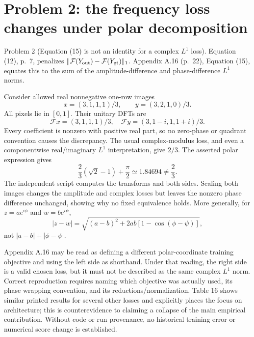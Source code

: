 \documentclass[10pt]{article}
\begin{document}
\section*{Problem 2: the frequency loss changes under polar decomposition}
Problem 2 (Equation (15) is not an identity for a complex \(L^1\) loss).  Equation (12), p. 7, penalizes \(\|\mathcal F(Y_{\rm out})-\mathcal F(Y_{\rm gt})\|_1\). Appendix A.16 (p. 22), Equation (15), equates this to the sum of the amplitude-difference and phase-difference \(L^1\) norms.\par
Consider allowed real nonnegative one-row images \[x=(3,1,1,1)/3,\qquad y=(3,2,1,0)/3.\] All pixels lie in \([0,1]\). Their unitary DFTs are \[\mathcal F x=(3,1,1,1)/3,\quad
 \mathcal F y=(3,1-i,1,1+i)/3.\] Every coefficient is nonzero with positive real part, so no zero-phase or quadrant convention causes the discrepancy. The usual complex-modulus loss, and even a componentwise real/imaginary \(L^1\) interpretation, give \(2/3\). The asserted polar expression gives \[\frac{2}{3}(\sqrt2-1)+\frac{\pi}{2}
 \simeq 1.84694\ne\frac23.\] The independent script computes the transforms and both sides. Scaling both images changes the amplitude and complex losses but leaves the nonzero phase difference unchanged, showing why no fixed equivalence holds. More generally, for \(z=a e^{i\phi}\) and \(w=b e^{i\psi}\), \[|z-w|=\sqrt{(a-b)^2+2ab[1-\cos(\phi-\psi)]},\] not \(|a-b|+|\phi-\psi|\).\par
Appendix A.16 may be read as defining a different polar-coordinate training objective and using the left side as shorthand. Under that reading, the right side is a valid chosen loss, but it must not be described as the same complex \(L^1\) norm. Correct reproduction requires naming which objective was actually used, its phase wrapping convention, and its reductions/normalization. Table 16 shows similar printed results for several other losses and explicitly places the focus on architecture; this is counterevidence to claiming a collapse of the main empirical contribution. Without code or run provenance, no historical training error or numerical score change is established.\par
\end{document}
